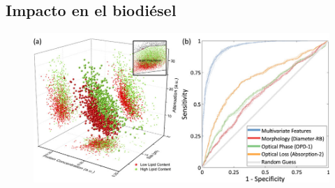 \documentclass{beamer}
\begin{document}
\subsection{Impacto en el biodiésel}

\begin{frame}
	\begin{figure}
		\centering
		\includegraphics[width=\linewidth]{impacto_2}
	\end{figure}
\end{frame}
	
\end{document}

